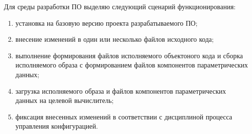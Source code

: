 Для среды разработки ПО выделяю следующий сценарий функционирования:
\begin{enumerate}
    \item установка на базовую версию проекта разрабатываемого ПО;
    \item внесение изменений в один или несколько файлов исходного кода;
    \item выполнение формирования файлов исполняемого объектоного кода и сборка исполняемого образа с формированием файлов компонентов параметрических данных;
    \item загрузка исполняемого образа и файлов компонентов параметрических данных на целевой вычислитель;
    \item фиксация внесенных изменений в соответствии с дисциплиной процесса управления конфигурацией.
\end{enumerate}